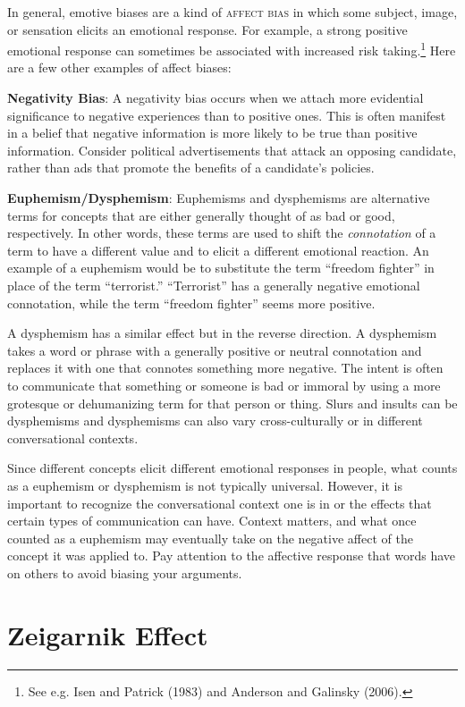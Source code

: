 In general, emotive biases are a kind of \textsc{\gls{affect bias}} in which some subject, image, or sensation elicits an emotional response. For example, a strong positive emotional response can sometimes be associated with increased risk taking.\footnote{See e.g. Isen and Patrick (1983) and Anderson and Galinsky (2006).} Here are a few other examples of affect biases:

\textbf{Negativity Bias}: A negativity bias occurs when we attach more evidential significance to negative experiences than to positive ones. This is often manifest in  a belief that negative information is more likely to be true than positive information. Consider political advertisements that attack an opposing candidate, rather than ads that promote the benefits of a candidate's policies.

\textbf{Euphemism/Dysphemism}: Euphemisms and dysphemisms are alternative terms for concepts that are either generally thought of as bad or good, respectively. In other words, these terms are used to shift the \emph{connotation} of a term to have a different value and to elicit a different emotional reaction. An example of a euphemism would be to substitute the term ``freedom fighter'' in place of the term ``terrorist.'' ``Terrorist'' has a generally negative emotional connotation, while the term ``freedom fighter'' seems more positive.

A dysphemism has a similar effect but in the reverse direction. A dysphemism takes a word or phrase with a generally positive or neutral connotation and replaces it with one that connotes something more negative. The intent is often to communicate that something or someone is bad or immoral by using a more grotesque or dehumanizing term for that person or thing. Slurs and insults can be dysphemisms and dysphemisms can also vary cross-culturally or in different conversational contexts.

Since different concepts elicit different emotional responses in people, what counts as a euphemism or dysphemism is not typically universal. However, it is important to recognize the conversational context one is in or the effects that certain types of communication can have. Context matters, and what once counted as a euphemism may eventually take on the negative affect of the concept it was applied to. Pay attention to the affective response that words have on others to avoid biasing your arguments.

\section{Zeigarnik Effect}

